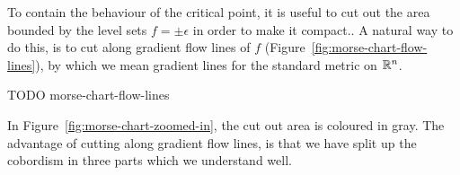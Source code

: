 To contain the behaviour of the critical point, it is useful to cut out the area bounded by the level sets $f = \pm \epsilon$ in order to make it compact..
A natural way to do this, is to cut along gradient flow lines of $f$ (Figure~\ref{fig:morse-chart-flow-lines}), by which we mean gradient lines for the standard metric on $\mathbb{R}^{n}$.
\begin{marginfigure}
    \centering
    \caption{TODO morse-chart-flow-lines}
    \label{fig:morse-chart-flow-lines}
\end{marginfigure}
In Figure~\ref{fig:morse-chart-zoomed-in}, the cut out area is coloured in gray.
The advantage of cutting along gradient flow lines, is that we have split up the cobordism in three parts which we understand well.
